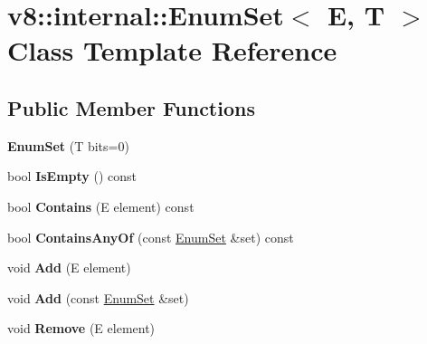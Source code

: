 \hypertarget{classv8_1_1internal_1_1_enum_set}{}\section{v8\+:\+:internal\+:\+:Enum\+Set$<$ E, T $>$ Class Template Reference}
\label{classv8_1_1internal_1_1_enum_set}
\subsection*{Public Member Functions}
\begin{DoxyCompactItemize}
\item 
\hypertarget{classv8_1_1internal_1_1_enum_set_aa49d5338228eb356b622f7e0f2f0d154}{}{\bfseries Enum\+Set} (T bits=0)\label{classv8_1_1internal_1_1_enum_set_aa49d5338228eb356b622f7e0f2f0d154}

\item 
\hypertarget{classv8_1_1internal_1_1_enum_set_ac2585f979c8889937f2a6ee0533379de}{}bool {\bfseries Is\+Empty} () const \label{classv8_1_1internal_1_1_enum_set_ac2585f979c8889937f2a6ee0533379de}

\item 
\hypertarget{classv8_1_1internal_1_1_enum_set_a8699967dac5219fa0891c333a13bae93}{}bool {\bfseries Contains} (E element) const \label{classv8_1_1internal_1_1_enum_set_a8699967dac5219fa0891c333a13bae93}

\item 
\hypertarget{classv8_1_1internal_1_1_enum_set_a78895bcbbca5f4713e3734619c7d9085}{}bool {\bfseries Contains\+Any\+Of} (const \hyperlink{classv8_1_1internal_1_1_enum_set}{Enum\+Set} \&set) const \label{classv8_1_1internal_1_1_enum_set_a78895bcbbca5f4713e3734619c7d9085}

\item 
\hypertarget{classv8_1_1internal_1_1_enum_set_af854cc88381481e5fe5e6550b12fe11d}{}void {\bfseries Add} (E element)\label{classv8_1_1internal_1_1_enum_set_af854cc88381481e5fe5e6550b12fe11d}

\item 
\hypertarget{classv8_1_1internal_1_1_enum_set_a6b035c820d2141ea9da9696becdaaa20}{}void {\bfseries Add} (const \hyperlink{classv8_1_1internal_1_1_enum_set}{Enum\+Set} \&set)\label{classv8_1_1internal_1_1_enum_set_a6b035c820d2141ea9da9696becdaaa20}

\item 
\hypertarget{classv8_1_1internal_1_1_enum_set_a2ebc5126eedda032e601eea6d0024b18}{}void {\bfseries Remove} (E element)\label{classv8_1_1internal_1_1_enum_set_a2ebc5126eedda032e601eea6d0024b18}


\end{DoxyCompactItemize}
